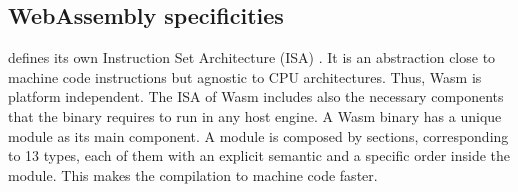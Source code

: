 








\subsection*{WebAssembly specificities}

\wasm defines its own Instruction Set Architecture (ISA) \cite{wasm_spec}. It is an abstraction close to machine code instructions but agnostic to CPU architectures. Thus, Wasm is platform independent. The ISA of Wasm includes also the necessary components that the binary requires to run in any host engine. 
A Wasm binary has a unique module as its main component. A module is composed by sections, corresponding to 13 types, each of them with an explicit semantic and a specific order inside the module. This makes the compilation to machine code faster. %


